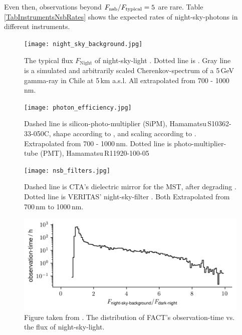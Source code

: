 \documentclass{article}%
\begin{document}
\begin{multicols}{2}
%
Even then, observations beyond $F_\text{nsb}{} / F_\text{typical}{} = 5$ are rare.
%
Table \ref{TabInstrumentsNsbRates} shows the expected rates of night-sky-photons in different instruments.
%
\begin{figure}[H]%
\centering%
\texttt{[image: night\_sky\_background.jpg]}%
\caption{
The typical flux $F_\text{Night}$ of night-sky-light \cite{gaug2013night}.
Dotted line is \cite{preuss2002study}.
Gray line is a simulated and arbitrarily scaled Cherenkov-spectrum of a 5\,GeV gamma-ray in Chile at 5\,km a.s.l.
All extrapolated from 700 - 1000\,nm.
}%
\label{fig:nsb}
\end{figure}
%
\begin{figure}[H]%
\centering%
\texttt{[image: photon\_efficiency.jpg]}%
\caption{
Dashed line is silicon-photo-multiplier (SiPM), \mbox{Hamamatsu\,S10362-33-050C}, shape according to \cite{hamamatsu2009mppc}, and scaling according to \cite{anderhub2013design}.
Extrapolated from 700 - 1000\,nm.
Dotted line is photo-multiplier-tube (PMT), \mbox{Hamamatsu\,R11920-100-05} \cite{toyama2013novel}
}%
\label{fig:pde}
\end{figure}
%
\begin{figure}[H]%
\centering%
\texttt{[image: nsb\_filters.jpg]}%
\caption{
Dashed line is CTA's dielectric mirror for the MST, after degrading \cite{pareschi2013status,pareschi2013statusarxiv}.
%
Dotted line is VERITAS' night-sky-filter \cite{archambault2017gamma}.
%
Both Extrapolated from 700\,nm to 1000\,nm.
}%
\label{FigNsbFilter}
\end{figure}
%
\begin{figure}[H]%
\centering%
\includegraphics[width=1.0\linewidth]{observation_time_histogram.png}%
\caption{
Figure taken from \cite{mueller2019phd}.
%
The distribution of FACT's observation-time vs. the flux of night-sky-light.
}%
\label{fig:obstimeFact}
\end{figure}
%
\begin{table}[H]
  \begin{center}

\end{center}
\end{table}
\end{multicols}
\end{document}
